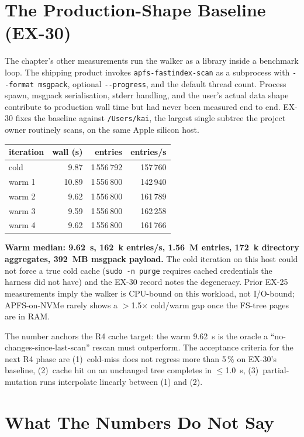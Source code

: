 \section{The Production-Shape Baseline (EX-30)}

The chapter's other measurements run the walker as a library
inside a benchmark loop. The shipping product invokes
\texttt{apfs-fastindex-scan} as a subprocess with
\texttt{-{}-format msgpack}, optional \texttt{-{}-progress}, and
the default thread count. Process spawn, msgpack serialisation,
stderr handling, and the user's actual data shape contribute to
production wall time but had never been measured end to end.
EX-30 fixes the baseline against \texttt{/Users/kai}, the largest
single subtree the project owner routinely scans, on the same
Apple silicon host.

\begin{center}
\begin{tabular}{lrrr}
\toprule
iteration & wall (s) & entries & entries/s \\
\midrule
cold    &  9.87 & 1\,556\,792 & 157\,760 \\
warm 1  & 10.89 & 1\,556\,800 & 142\,940 \\
warm 2  &  9.62 & 1\,556\,800 & 161\,789 \\
warm 3  &  9.59 & 1\,556\,800 & 162\,258 \\
warm 4  &  9.62 & 1\,556\,800 & 161\,766 \\
\bottomrule
\end{tabular}
\end{center}

\textbf{Warm median: 9.62~s, 162~k entries/s, 1.56~M entries,
172~k directory aggregates, 392~MB msgpack payload.} The cold
iteration on this host could not force a true cold cache
(\texttt{sudo -n purge} requires cached credentials the harness
did not have) and the EX-30 record notes the degeneracy.
Prior EX-25 measurements imply the walker is CPU-bound on this
workload, not I/O-bound; APFS-on-NVMe rarely shows a $>$1.5$\times$
cold/warm gap once the FS-tree pages are in RAM.

The number anchors the R4 cache target: the warm 9.62~s is the
oracle a ``no-changes-since-last-scan'' rescan must outperform.
The acceptance criteria for the next R4 phase are
(1)~cold-miss does not regress more than 5\,\% on EX-30's
baseline, (2)~cache hit on an unchanged tree completes in
$\leq$1.0~s, (3)~partial-mutation runs interpolate linearly
between (1) and (2).

\section{What The Numbers Do Not Say}

